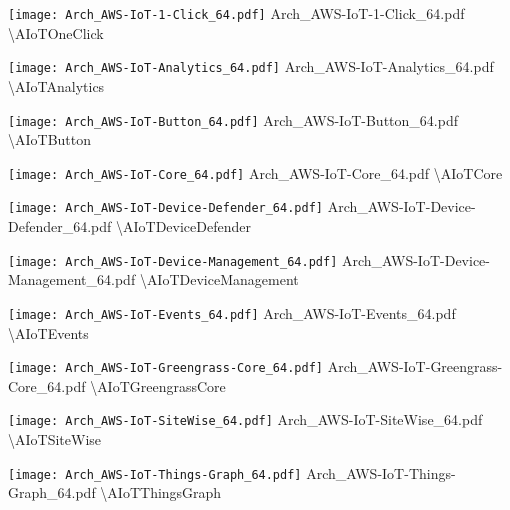  {\texttt{[image: Arch\_AWS-IoT-1-Click\_64.pdf]}} {Arch\_AWS-IoT-1-Click\_64.pdf} {{\textbackslash}AIoTOneClick}

 {\texttt{[image: Arch\_AWS-IoT-Analytics\_64.pdf]}} {Arch\_AWS-IoT-Analytics\_64.pdf} {{\textbackslash}AIoTAnalytics}

 {\texttt{[image: Arch\_AWS-IoT-Button\_64.pdf]}} {Arch\_AWS-IoT-Button\_64.pdf} {{\textbackslash}AIoTButton}

 {\texttt{[image: Arch\_AWS-IoT-Core\_64.pdf]}} {Arch\_AWS-IoT-Core\_64.pdf} {{\textbackslash}AIoTCore}

 {\texttt{[image: Arch\_AWS-IoT-Device-Defender\_64.pdf]}} {Arch\_AWS-IoT-Device-Defender\_64.pdf} {{\textbackslash}AIoTDeviceDefender}

 {\texttt{[image: Arch\_AWS-IoT-Device-Management\_64.pdf]}} {Arch\_AWS-IoT-Device-Management\_64.pdf} {{\textbackslash}AIoTDeviceManagement}

 {\texttt{[image: Arch\_AWS-IoT-Events\_64.pdf]}} {Arch\_AWS-IoT-Events\_64.pdf} {{\textbackslash}AIoTEvents}

 {\texttt{[image: Arch\_AWS-IoT-Greengrass-Core\_64.pdf]}} {Arch\_AWS-IoT-Greengrass-Core\_64.pdf} {{\textbackslash}AIoTGreengrassCore}

 {\texttt{[image: Arch\_AWS-IoT-SiteWise\_64.pdf]}} {Arch\_AWS-IoT-SiteWise\_64.pdf} {{\textbackslash}AIoTSiteWise}

 {\texttt{[image: Arch\_AWS-IoT-Things-Graph\_64.pdf]}} {Arch\_AWS-IoT-Things-Graph\_64.pdf} {{\textbackslash}AIoTThingsGraph}

